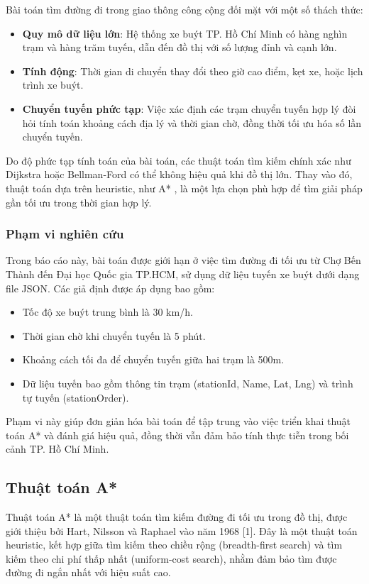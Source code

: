 \documentclass[a4paper,12pt]{article}
\begin{document}
Bài toán tìm đường đi trong giao thông công cộng đối mặt với một số thách thức:
\begin{itemize}
    \item \textbf{Quy mô dữ liệu lớn}: Hệ thống xe buýt TP. Hồ Chí Minh có hàng nghìn trạm và hàng trăm tuyến, dẫn đến đồ thị với số lượng đỉnh và cạnh lớn.
    \item \textbf{Tính động}: Thời gian di chuyển thay đổi theo giờ cao điểm, kẹt xe, hoặc lịch trình xe buýt.
    \item \textbf{Chuyển tuyến phức tạp}: Việc xác định các trạm chuyển tuyến hợp lý đòi hỏi tính toán khoảng cách địa lý và thời gian chờ, đồng thời tối ưu hóa số lần chuyển tuyến.
\end{itemize}
Do độ phức tạp tính toán của bài toán, các thuật toán tìm kiếm chính xác như Dijkstra hoặc Bellman-Ford có thể không hiệu quả khi đồ thị lớn. Thay vào đó, thuật toán dựa trên heuristic, như A* \cite{cormen2009}, là một lựa chọn phù hợp để tìm giải pháp gần tối ưu trong thời gian hợp lý.

\subsubsection{Phạm vi nghiên cứu}

Trong báo cáo này, bài toán được giới hạn ở việc tìm đường đi tối ưu từ Chợ Bến Thành đến Đại học Quốc gia TP.HCM, sử dụng dữ liệu tuyến xe buýt dưới dạng file JSON. Các giả định được áp dụng bao gồm:
\begin{itemize}
    \item Tốc độ xe buýt trung bình là 30 km/h.
    \item Thời gian chờ khi chuyển tuyến là 5 phút.
    \item Khoảng cách tối đa để chuyển tuyến giữa hai trạm là 500m.
    \item Dữ liệu tuyến bao gồm thông tin trạm (stationId, Name, Lat, Lng) và trình tự tuyến (stationOrder).
\end{itemize}
Phạm vi này giúp đơn giản hóa bài toán để tập trung vào việc triển khai thuật toán A* \cite{cormen2009} và đánh giá hiệu quả, đồng thời vẫn đảm bảo tính thực tiễn trong bối cảnh TP. Hồ Chí Minh.

\subsection{Thuật toán A*}
Thuật toán A* \cite{cormen2009} là một thuật toán tìm kiếm đường đi tối ưu trong đồ thị, được giới thiệu bởi Hart, Nilsson và Raphael vào năm 1968 [1]. Đây là một thuật toán heuristic, kết hợp giữa tìm kiếm theo chiều rộng (breadth-first search) và tìm kiếm theo chi phí thấp nhất (uniform-cost search), nhằm đảm bảo tìm được đường đi ngắn nhất với hiệu suất cao.
\end{document}
